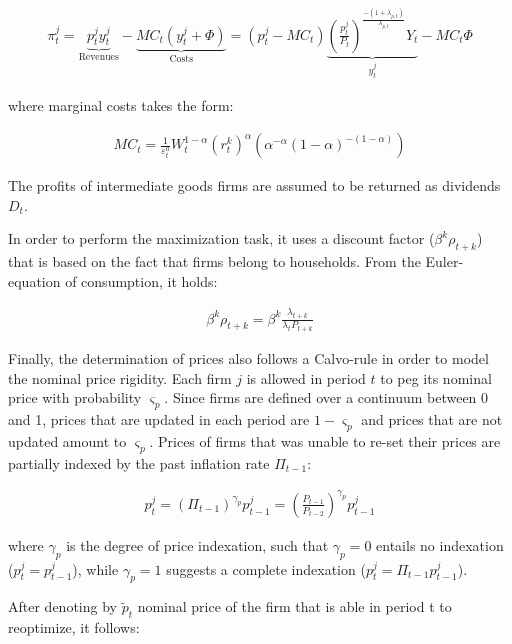 \documentclass{pracamgr}
\numberwithin{equation}{section}
\begin{document}
\begin{align} \label{Nominal profits}
\pi_{t}^{j} = \underbrace{p_{t}^{j} y_{t}^{j}}_\text{Revenues} - \underbrace{MC_{t} \left(y_{t}^{j} + \Phi \right)}_\text{Costs} = \left(p_{t}^{j} - MC_{t} \right) \underbrace{\left( \frac{p_{t}^{j}}{P_{t}} \right)^{\frac{-(1+\lambda_{p,t})}{\lambda_{p,t}}} Y_{t}}_{y_{t}^{j}} - MC_{t}\Phi
\end{align}

where marginal costs takes the form:

\begin{align}
MC_{t} = \frac{1}{\varepsilon_{t}^{a}} W_{t}^{1-\alpha} \left(r_{t}^{k} \right)^{\alpha} \left( \alpha^{-\alpha} (1-\alpha)^{-(1-\alpha)}\right)
\end{align}

The profits of intermediate goods firms are assumed to be returned as dividends $D_{t}$.

In order to perform the maximization task, it uses a discount factor ($\beta^{k} \rho_{t +k}$) that is based on the fact that firms belong to households. From the Euler-equation of consumption, it holds:


\begin{align} \label{Euler for firm}
\beta^{k} \rho_{t +k} = \beta^{k} \frac{\lambda_{t+k}}{\lambda_{t}P_{t+k}}
\end{align} 

Finally, the determination of prices also follows a Calvo-rule in order to model the nominal price rigidity. Each firm $j$ is allowed in period $t$ to peg its nominal price with probability $\varsigma_{p}$. Since firms are defined over a continuum between 0 and 1, prices that are updated in each period are $1-\varsigma_{p}$ and prices that are not updated amount to $\varsigma_{p}$. Prices of firms that was unable to re-set their prices are partially indexed by the past inflation rate $\Pi_{t-1}$:

\begin{align}
p_{t}^{j} = \left( \Pi_{t-1} \right)^{\gamma_{p}}p_{t-1}^{j} = \left( \frac{P_{t-1}}{P_{t-2}} \right)^{\gamma_{p}}p_{t-1}^{j}
\end{align}

where $\gamma_{p}$ is the degree of price indexation, such that $\gamma_{p} = 0$ entails no indexation ($p_{t}^{j} = p_{t-1}^{j}$), while $\gamma_{p} = 1$ suggests a complete indexation ($p_{t}^{j} = \Pi_{t-1} p_{t-1}^{j}$).

After denoting by $\widetilde{p}_{t}$ nominal price of the firm that is able in period t to reoptimize, it follows:
\end{document}
